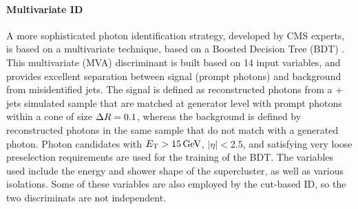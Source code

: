 \paragraph{Multivariate ID\\}
A more sophisticated photon identification strategy, developed by CMS experts, is based on a multivariate technique, based on a Boosted Decision Tree (BDT) \cite{CMS:EGM-17-001}.
This multivariate (MVA) discriminant is built based on 14 input variables,
and provides excellent separation between signal (prompt photons) and background from misidentified jets.
The signal is defined as reconstructed photons from a \PGg + jets simulated sample that are matched at generator level with prompt photons within a cone of size $\Delta R = 0.1$,
whereas the background is defined by reconstructed photons in the same sample that do not match with a generated photon.
Photon candidates with $E_{\mathrm{T}} > 15 \,\text{Ge\hspace{-.08em}V}$, $|\eta| < 2.5$, and satisfying very loose preselection requirements are used for the training of the BDT.
The variables used include the energy and shower shape of the supercluster, as well as various isolations.
Some of these variables are also employed by the cut-based ID, so the two discriminats are not independent.

